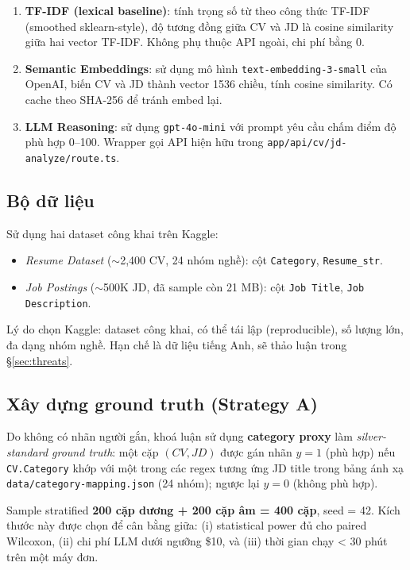 \documentclass[a4paper,13pt]{report}
\begin{document}
\begin{enumerate}
    \item \textbf{TF-IDF (lexical baseline)}: tính trọng số từ theo công thức TF-IDF (smoothed sklearn-style), độ tương đồng giữa CV và JD là cosine similarity giữa hai vector TF-IDF. Không phụ thuộc API ngoài, chi phí bằng 0.
    \item \textbf{Semantic Embeddings}: sử dụng mô hình \texttt{text-embedding-3-small} của OpenAI, biến CV và JD thành vector 1536 chiều, tính cosine similarity. Có cache theo SHA-256 để tránh embed lại.
    \item \textbf{LLM Reasoning}: sử dụng \texttt{gpt-4o-mini} với prompt yêu cầu chấm điểm độ phù hợp 0--100. Wrapper gọi API hiện hữu trong \texttt{app/api/cv/jd-analyze/route.ts}.
\end{enumerate}

\subsection{Bộ dữ liệu}

Sử dụng hai dataset công khai trên Kaggle:

\begin{itemize}
    \item \textit{Resume Dataset} ($\sim$2,400 CV, 24 nhóm nghề): cột \texttt{Category}, \texttt{Resume\_str}.
    \item \textit{Job Postings} ($\sim$500K JD, đã sample còn 21 MB): cột \texttt{Job Title}, \texttt{Job Description}.
\end{itemize}

Lý do chọn Kaggle: dataset công khai, có thể tái lập (reproducible), số lượng lớn, đa dạng nhóm nghề. Hạn chế là dữ liệu tiếng Anh, sẽ thảo luận trong \S\ref{sec:threats}.

\subsection{Xây dựng ground truth (Strategy A)}
\label{sec:gt}

Do không có nhãn người gắn, khoá luận sử dụng \textbf{category proxy} làm \textit{silver-standard ground truth}: một cặp $(CV, JD)$ được gán nhãn $y=1$ (phù hợp) nếu \texttt{CV.Category} khớp với một trong các regex tương ứng JD title trong bảng ánh xạ \texttt{data/category-mapping.json} (24 nhóm); ngược lại $y=0$ (không phù hợp).

Sample stratified \textbf{200 cặp dương + 200 cặp âm = 400 cặp}, seed = 42. Kích thước này được chọn để cân bằng giữa: (i) statistical power đủ cho paired Wilcoxon, (ii) chi phí LLM dưới ngưỡng \$10, và (iii) thời gian chạy < 30 phút trên một máy đơn.
\end{document}
